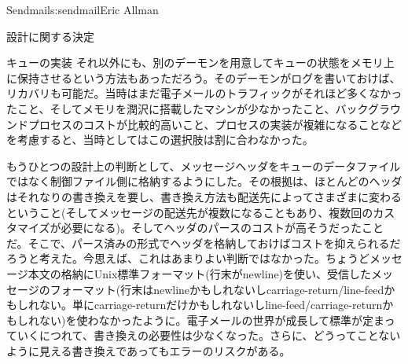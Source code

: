 \begin{aosachapter}{Sendmail}{s:sendmail}{Eric Allman}
\begin{aosasect1}{設計に関する決定}
\begin{aosasect2}{キューの実装}
それ以外にも、別のデーモンを用意してキューの状態をメモリ上に保持させるという方法もあっただろう。そのデーモンがログを書いておけば、リカバリも可能だ。当時はまだ電子メールのトラフィックがそれほど多くなかったこと、そしてメモリを潤沢に搭載したマシンが少なかったこと、バックグラウンドプロセスのコストが比較的高いこと、プロセスの実装が複雑になることなどを考慮すると、当時としてはこの選択肢は割に合わなかった。

もうひとつの設計上の判断として、メッセージヘッダをキューのデータファイルではなく制御ファイル側に格納するようにした。その根拠は、ほとんどのヘッダはそれなりの書き換えを要し、書き換え方法も配送先によってさまざまに変わるということ(そしてメッセージの配送先が複数になることもあり、複数回のカスタマイズが必要になる)。そしてヘッダのパースのコストが高そうだったことだ。そこで、パース済みの形式でヘッダを格納しておけばコストを抑えられるだろうと考えた。今思えば、これはあまりよい判断ではなかった。ちょうどメッセージ本文の格納にUnix標準フォーマット(行末がnewline)を使い、受信したメッセージのフォーマット(行末はnewlineかもしれないしcarriage-return/line-feedかもしれない。単にcarriage-returnだけかもしれないしline-feed/carriage-returnかもしれない)を使わなかったように。電子メールの世界が成長して標準が定まっていくにつれて、書き換えの必要性は少なくなった。さらに、どうってことないように見える書き換えであってもエラーのリスクがある。


\end{aosasect2}
\end{aosasect1}
\end{aosachapter}
